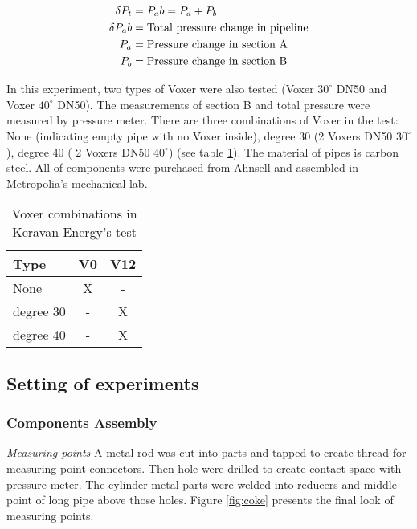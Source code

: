 \begin{align}
\delta P_t&= P_ab = P_a + P_b \\
\delta P_ab&= \textnormal{Total pressure change in pipeline} \\
P_a&= \textnormal{Pressure change in section A} \\
P_b&= \textnormal{Pressure change in section B} \\
\end{align}

In this experiment, two types of Voxer were also tested (Voxer $30^{\circ}$ DN50 and Voxer $40^{\circ}$ DN50). The measurements of section B and total pressure were measured by pressure meter. There are three combinations of Voxer in the test: None (indicating empty pipe with no Voxer inside), degree 30 (2 Voxers DN50 $30^{\circ}$), degree 40 ( 2 Voxers DN50 $40^{\circ}$) (see table \ref{table:kerava}). The material of pipes is carbon steel. All of components were purchased from Ahnsell and assembled in Metropolia's mechanical lab.

\begin{table}[h]
  \centering
  \caption{Voxer combinations in Keravan Energy's test}
  \begin{tabular}{l*{2}{c}}
Type             & V0 & V12 \\
\hline
None & X & -   \\
degree 30           & - & X   \\
degree 40          & - & X   \\
\end{tabular}
  \label{table:kerava}
\end{table}

\subsection{Setting of experiments}

\subsubsection{Components Assembly}

\textit{Measuring points}\newline
A metal rod was cut into parts and tapped to create thread for measuring point connectors. Then hole were drilled to create contact space with pressure meter. The cylinder metal parts were welded into reducers and middle point of long pipe above those holes. Figure \vref{fig:coke} presents the final look of measuring points.

